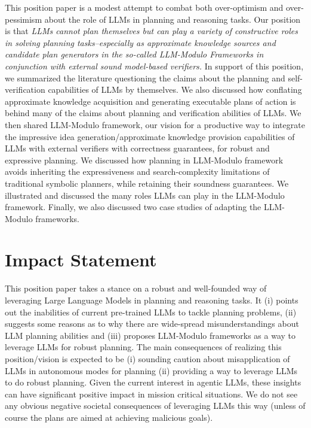 \documentclass{article}
\theoremstyle{plain}
\theoremstyle{definition}
\theoremstyle{remark}
\begin{document}
This 
position 
paper is a modest attempt to combat both over-optimism and over-pessimism about the role of LLMs in planning and reasoning tasks. 
Our position is that \textit{LLMs cannot plan themselves but can play a variety of constructive roles in solving planning tasks--especially as approximate knowledge sources and candidate plan generators in the so-called LLM-Modulo Frameworks in conjunction with external sound model-based verifiers.} In support of this position, we summarized the literature questioning the claims about the planning and self-verification capabilities of LLMs by themselves. We also discussed how conflating approximate knowledge acquisition and generating executable plans of action is behind many of the claims about planning and verification abilities of LLMs. We then shared LLM-Modulo framework, our vision for a productive way to integrate the impressive idea generation/approximate knowledge provision capabilities of LLMs with external verifiers with correctness guarantees, for robust and expressive planning. We discussed how planning in LLM-Modulo framework avoids inheriting the expressiveness and search-complexity limitations of traditional symbolic planners, while retaining their soundness guarantees. We illustrated and discussed the many roles LLMs can play in the LLM-Modulo framework. Finally, we also discussed two case studies of adapting the LLM-Modulo frameworks.  
\newpage



\section*{Impact Statement}

This position paper takes a stance on a robust and well-founded way of leveraging Large Language Models in planning and reasoning tasks. It (i) points out the inabilities of current pre-trained LLMs to tackle planning problems, (ii) suggests some reasons as to why there are wide-spread misunderstandings about LLM planning abilities and (iii) proposes LLM-Modulo frameworks as a way to leverage LLMs for robust planning. The main consequences of realizing this position/vision is expected to be (i) sounding caution about misapplication of LLMs in autonomous modes for planning (ii) providing a way to leverage LLMs to do robust planning. 
Given the current interest in agentic LLMs, these insights 
can have significant positive impact in mission critical situations. We do not see any obvious negative societal consequences of leveraging LLMs this way (unless of course the plans are aimed at achieving malicious goals). 
\end{document}
